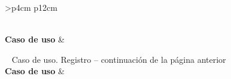 
\begin{longtable}{
    >{}p{4cm}
    p{12cm}
    }
    \caption{Caso de uso. Registro} \label{table:cu_registro} \\
    \toprule
    \textbf{Caso de uso} &  \\
    \endfirsthead
    
    {{ \tablename\ \thetable{} Caso de uso. Registro -- continuación de la página anterior}} \\
    \toprule
    \textbf{Caso de uso} &  \\
    \midrule
    \endhead
    
    \midrule
     \\ 
    \endfoot
    
    \bottomrule
    \endlastfoot
    

\end{longtable}
